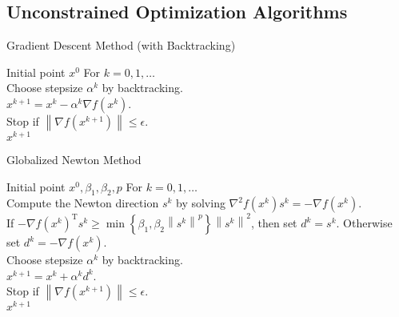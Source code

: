 \documentclass[11pt]{article}
\begin{document}
\subsection{Unconstrained Optimization Algorithms}
\begin{algorithm}[H]
  \caption{Gradient Descent Method (with Backtracking)}
  \label{alg:Gradient}
  \begin{algorithmic}[1]
  \REQUIRE
  Initial point $x^{0}$
  \STATE For $k=0,1, \ldots$ \\
  \STATE Choose stepsize $\alpha^{k}$ by backtracking. \\
  \STATE $x^{k+1}=x^{k}-\alpha^{k} \nabla f\left(x^{k}\right)$. \\
  \STATE Stop if $\left\|\nabla f\left(x^{k+1}\right)\right\| \leq \epsilon$. \\     
  \ENSURE $x^{k+1}$ 
 \end{algorithmic}
 \end{algorithm} 
 
 \begin{algorithm}[H]
   \caption{Globalized Newton Method}
   \label{alg:Newton}
   \begin{algorithmic}[1]
   \REQUIRE
   Initial point $x^{0}, \beta_{1}, \beta_{2}, p$
   \STATE For $k=0,1, \ldots$ \\
   \STATE Compute the Newton direction $s^{k}$ by solving $\nabla^{2} f\left(x^{k}\right) s^{k}=-\nabla f\left(x^{k}\right)$. \\
   \STATE If $-\nabla f\left(x^{k}\right)^{\mathrm{T}} s^{k} \geq \min \left\{\beta_{1}, \beta_{2}\left\|s^{k}\right\|^{p}\right\}\left\|s^{k}\right\|^{2}$, then set $d^{k}=s^{k}$. Otherwise set $d^{k}=-\nabla f\left(x^{k}\right)$. \\
   \STATE Choose stepsize $\alpha^{k}$ by backtracking. \\  
   \STATE $x^{k+1}=x^{k}+\alpha^{k} d^{k}$. \\
   \STATE  Stop if $\left\|\nabla f\left(x^{k+1}\right)\right\| \leq \epsilon$. \\  
   \ENSURE $x^{k+1}$ 
  \end{algorithmic}
  \end{algorithm} 
 
 
 
 
 
\end{document}
